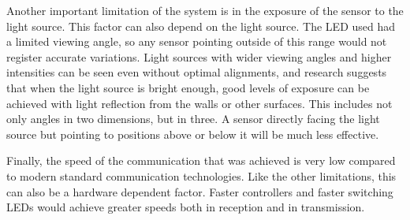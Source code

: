 Another important limitation of the system is in the exposure of the sensor to the light source.
This factor can also depend on the light source.
The LED used had a limited viewing angle, so any sensor pointing outside of this range would not register accurate variations.
Light sources with wider viewing angles and higher intensities can be seen even without optimal alignments, and research suggests that when the light source is bright enough, good levels of exposure can be achieved with light reflection from the walls or other surfaces\cite{interferenceVLC}.
This includes not only angles in two dimensions, but in three. A sensor directly facing the light source but pointing to positions above or below it will be much less effective.

Finally, the speed of the communication that was achieved is very low compared to modern standard communication technologies.
Like the other limitations, this can also be a hardware dependent factor.
Faster controllers and faster switching LEDs would achieve greater speeds both in reception and in transmission.

